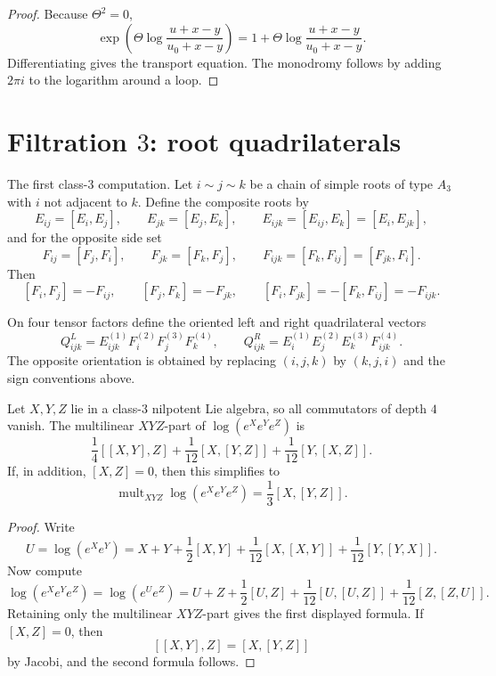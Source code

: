 \begin{proof}
Because $\Theta^2=0$,
\[
\exp\left(\Theta\log\!\frac{u+x-y}{u_0+x-y}\right)
=1+\Theta\log\!\frac{u+x-y}{u_0+x-y}.
\]
Differentiating gives the transport equation. The monodromy follows by
adding $2\pi i$ to the logarithm around a loop.
\end{proof}

\section{Filtration $3$: root quadrilaterals}

The first class-$3$ computation.
Let $i\sim j\sim k$ be a chain of simple roots of type $A_3$ with
$i$ not adjacent to $k$. Define the composite roots by
\[
E_{ij}=[E_i,E_j],
\qquad
E_{jk}=[E_j,E_k],
\qquad
E_{ijk}=[E_{ij},E_k]=[E_i,E_{jk}],
\]
and for the opposite side set
\[
F_{ij}=[F_j,F_i],
\qquad
F_{jk}=[F_k,F_j],
\qquad
F_{ijk}=[F_k,F_{ij}]=[F_{jk},F_i].
\]
Then
\[
[F_i,F_j]=-F_{ij},
\qquad
[F_j,F_k]=-F_{jk},
\qquad
[F_i,F_{jk}]=-[F_k,F_{ij}]=-F_{ijk}.
\]

\begin{definition}
On four tensor factors define the oriented left and right quadrilateral
vectors
\[
Q_{ijk}^{L}=E_{ijk}^{(1)}F_i^{(2)}F_j^{(3)}F_k^{(4)},
\qquad
Q_{ijk}^{R}=E_i^{(1)}E_j^{(2)}E_k^{(3)}F_{ijk}^{(4)}.
\]
The opposite orientation is obtained by replacing $(i,j,k)$ by
$(k,j,i)$ and the sign conventions above.
\end{definition}

\begin{lemma}
\label{lem:class3-ordered-bch}
Let $X,Y,Z$ lie in a class-$3$ nilpotent Lie algebra, so all
commutators of depth $4$ vanish. The multilinear $XYZ$-part of
$\log(e^Xe^Ye^Z)$ is
\[
\frac14[[X,Y],Z]+\frac1{12}[X,[Y,Z]]+\frac1{12}[Y,[X,Z]].
\]
If, in addition, $[X,Z]=0$, then this simplifies to
\[
\operatorname{mult}_{XYZ}\log(e^Xe^Ye^Z)
=\frac13[X,[Y,Z]].
\]
\end{lemma}

\begin{proof}
Write
\[
U=\log(e^Xe^Y)=X+Y+\frac12[X,Y]+\frac1{12}[X,[X,Y]]
+\frac1{12}[Y,[Y,X]].
\]
Now compute
\[
\log(e^Xe^Ye^Z)=\log(e^Ue^Z)
=U+Z+\frac12[U,Z]+\frac1{12}[U,[U,Z]]+\frac1{12}[Z,[Z,U]].
\]
Retaining only the multilinear $XYZ$-part gives the first displayed
formula. If $[X,Z]=0$, then
\[
[[X,Y],Z]=[X,[Y,Z]]
\]
by Jacobi, and the second formula follows.
\end{proof}

